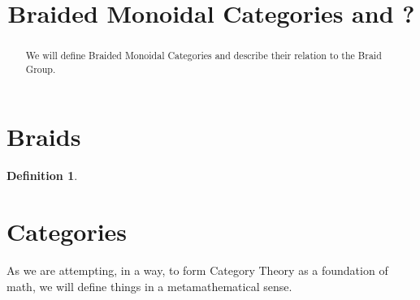 \documentclass[12pt,a4paper]{article}
\title{Braided Monoidal Categories and ?}
\date{}
\newtheorem{definition}[theorem]{Definition}
\begin{document}
	

	
\maketitle

\begin{abstract}
We will define Braided Monoidal Categories and describe their relation to the Braid Group.
\end{abstract}

\section{Braids}

\begin{definition}
    
\end{definition}


\section{Categories}

As we are attempting, in a way, to form Category Theory as a foundation of math, we will define things in a metamathematical sense.
\end{document}
